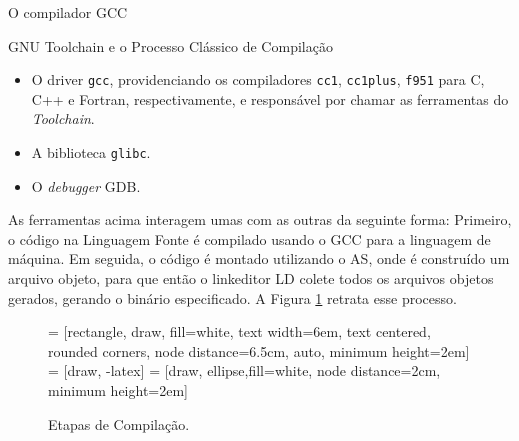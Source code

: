 \begin{section}{O compilador GCC}
\begin{subsection}{GNU Toolchain e o Processo Clássico de Compilação}
\begin{itemize}
    \item O driver \texttt{gcc}, providenciando os compiladores \texttt{cc1},
        \texttt{cc1plus}, \texttt{f951} para C, C++ e Fortran, respectivamente,
        e responsável por chamar as ferramentas do \textit{Toolchain}.

    \item A biblioteca \texttt{glibc}.

    \item O \textit{debugger} GDB.
\end{itemize}

As ferramentas acima interagem umas com as outras da seguinte forma: Primeiro, o código na
Linguagem Fonte é compilado usando o GCC para a linguagem de máquina. Em seguida, o código
é montado utilizando o AS, onde é construído um arquivo objeto, para que então o linkeditor
LD colete todos os arquivos objetos gerados, gerando o binário especificado. A Figura
\ref{fig:gnu_toolchain} retrata esse processo.


\begin{figure}
 = [rectangle, draw, fill=white,
    text width=6em, text centered, rounded corners, node distance=6.5cm, auto, minimum height=2em]
 = [draw, -latex]
 = [draw, ellipse,fill=white, node distance=2cm,
    minimum height=2em]
\begin{center}
\end{center}
\caption{Etapas de Compilação.}
\label{fig:gnu_toolchain}
\end{figure}


\end{subsection}
\end{section}
